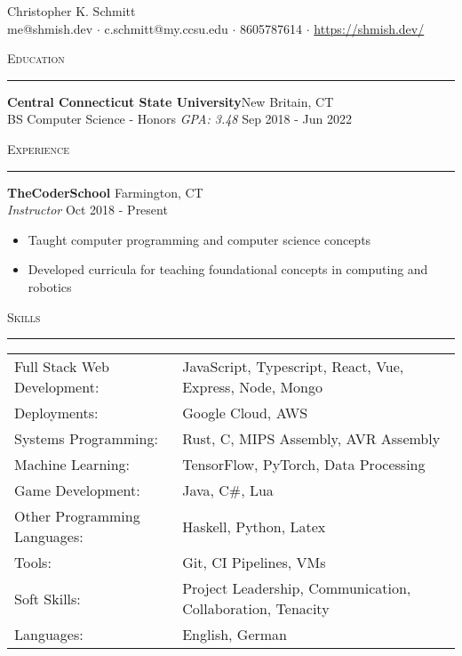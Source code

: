 \documentclass[a4paper]{article}
\newenvironment{cvsection}[1]{
  \noindent\textsc{#1}
  \vspace{4pt}
  \hrule
  \vspace{4pt}

}{\vspace{4pt}}
\newcommand{\school}[5] {
  \noindent\textbf{#1}\hfill #2\\
  \noindent#3 \textit{GPA: #4} \hfill #5\\
}
\newcommand{\employer}[4] {
  \noindent\textbf{#1} \hfill #2\\
  \noindent\textit{#3} \hfill #4\\
  \vspace{-8pt}
}
\begin{document}
  \begin{center}
    {\huge Christopher K. Schmitt}\\
    \vspace{8pt}
    me@shmish.dev $\cdot$ c.schmitt@my.ccsu.edu $\cdot$ 8605787614 $\cdot$ \href{https://shmish.dev/}{https://shmish.dev/}\\
  \end{center}

  \begin{cvsection}{Education}
    \school{Central Connecticut State University}{New Britain, CT}{BS Computer Science - Honors}{3.48}{Sep 2018 - Jun 2022}
  \end{cvsection}

  \begin{cvsection}{Experience}
    \employer{TheCoderSchool}{Farmington, CT}{Instructor}{Oct 2018 - Present}
    
    \begin{itemize}
      \item Taught computer programming and computer science concepts
      \item Developed curricula for teaching foundational concepts in computing and robotics
    \end{itemize}
  \end{cvsection}

  \begin{cvsection}{Skills}
    \begin{tabular}{ l l }
      Full Stack Web Development:  & JavaScript, Typescript, React, Vue, Express, Node, Mongo   \\
      Deployments:                 & Google Cloud, AWS                                          \\
      Systems Programming:         & Rust, C, MIPS Assembly, AVR Assembly                       \\
      Machine Learning:            & TensorFlow, PyTorch, Data Processing                       \\
      Game Development:            & Java, C\#, Lua                                             \\
      Other Programming Languages: & Haskell, Python, Latex                                     \\
      Tools:                       & Git, CI Pipelines, VMs                                     \\
      Soft Skills:                 & Project Leadership, Communication, Collaboration, Tenacity \\
      Languages:                   & English, German                                            \\
    \end{tabular}\\
  \end{cvsection}
\end{document}
